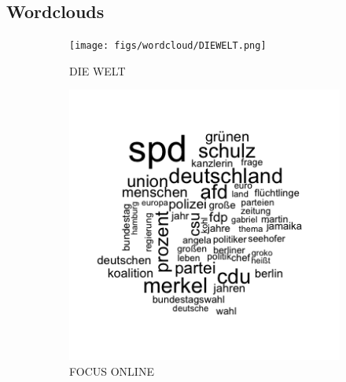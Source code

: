 \documentclass[12pt,a4paper,notitlepage]{article}
\begin{document}
\subsection{Wordclouds}\label{apx_wordclouds}
\begin{figure}[H]
	\begin{center}
		\begin{subfigure}[normla]{0.43\textwidth}
			\texttt{[image: figs/wordcloud/DIEWELT.png]}
			\caption{DIE WELT}
		\end{subfigure}
		\begin{subfigure}[normla]{0.43\textwidth}
			\includegraphics[width=\textwidth]{figs/wordcloud_FOCUSONLINE.png}
			\caption{FOCUS ONLINE}
		\end{subfigure}
		\begin{subfigure}[normla]{0.43\textwidth}

\end{subfigure}
\end{center}
\end{figure}
\end{document}
